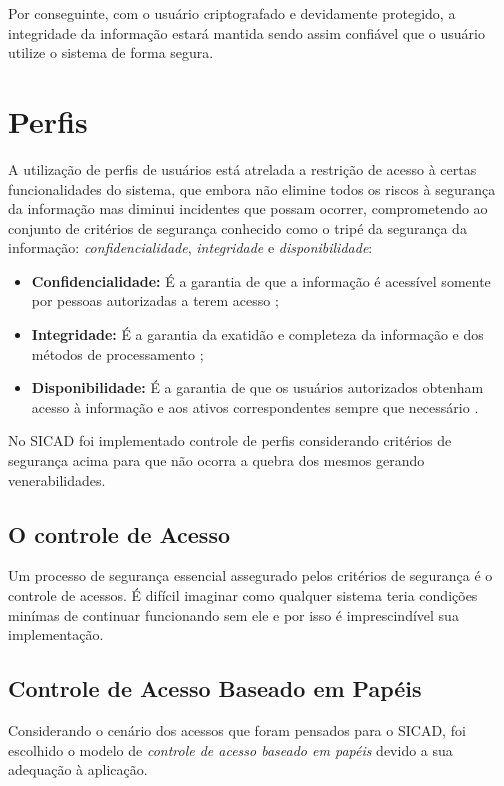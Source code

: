 \documentclass[12pt, a4paper]{report}
\begin{document}
Por conseguinte, com o usuário criptografado e devidamente protegido, a integridade da informação estará mantida sendo assim confiável que o usuário utilize o sistema de forma segura.

\section{ Perfis}
A utilização de perfis de usuários está atrelada a restrição de acesso à certas funcionalidades do sistema, que embora não elimine todos os riscos à segurança da informação mas diminui incidentes que possam ocorrer, comprometendo ao conjunto de critérios de segurança conhecido como o tripé da segurança da informação: \textit{confidencialidade}, \textit{integridade} e \textit{disponibilidade}:

\begin{itemize}
\item \textbf{Confidencialidade:} É a garantia de que a informação é acessível somente por pessoas autorizadas a terem acesso \cite{iso27002};
\item \textbf{Integridade:} É a garantia da exatidão e completeza da informação e dos métodos de processamento \cite{iso27002};
\item \textbf{Disponibilidade:} É a garantia de que os usuários autorizados obtenham acesso à informação e aos ativos correspondentes sempre  que necessário \cite{iso27002}.
\end{itemize}

No \ac{SICAD} foi implementado controle de perfis considerando critérios de segurança acima para que não ocorra a quebra dos mesmos gerando venerabilidades.

\subsection{O controle de Acesso}

Um processo de segurança essencial assegurado pelos critérios de segurança é o controle de acessos. É difícil imaginar como qualquer sistema teria condições minímas de continuar funcionando sem ele e por isso é imprescindível sua implementação.

\subsection{Controle  de  Acesso  Baseado  em  Papéis }

Considerando o cenário dos acessos que foram pensados para o \ac{SICAD}, foi escolhido o modelo de \textit{controle  de  acesso  baseado  em  papéis} devido a sua adequação à aplicação.
\end{document}
